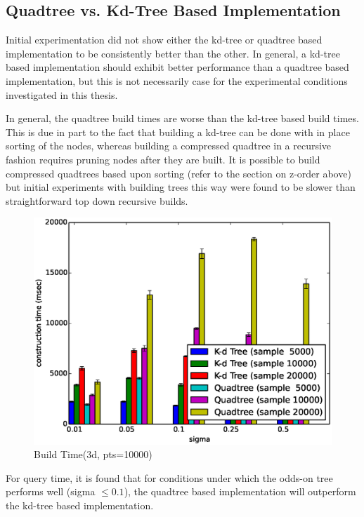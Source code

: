 \documentclass[mcs]{scsthesis}
\begin{document}
\subsection{Quadtree vs. Kd-Tree Based Implementation}

Initial experimentation did not show either the kd-tree or quadtree based
implementation to be consistently better than the other. In general, a kd-tree
based implementation should exhibit better performance than a quadtree based
implementation, but this is not necessarily case for the experimental
conditions investigated in this thesis.

In general, the quadtree build times are worse than the kd-tree based build
times. This is due in part to the fact that building a kd-tree can be done
with in place sorting of the nodes, whereas building a compressed quadtree
in a recursive fashion requires pruning nodes after they are built. It is
possible to build compressed quadtrees based upon sorting (refer to the section
on z-order above) but initial experiments with building trees this way were
found to be slower than straightforward top down recursive builds.

\begin{figure}
\begin{center}
\includegraphics[scale=0.5]{diagrams/3d_qt_kt_pts10000_ctime.eps}
\caption{Build Time(3d, pts=10000)}
\label{fig:3d_kd_qt_ctime}
\end{center}
\end{figure}

For query time, it is found that for conditions under which the odds-on tree
performs well (sigma \(\le 0.1\)), the quadtree based implementation will
outperform the kd-tree based implementation.
\end{document}
